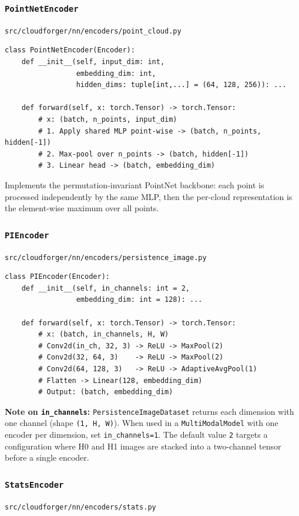 \documentclass[11pt, a4paper]{article}
\newcommand{\code}[1]{\texttt{#1}}
\newcommand{\pyfile}[1]{\texttt{\small #1}}
\newcommand{\typename}[1]{\textbf{\texttt{#1}}}
\begin{document}
\subsubsection{\typename{PointNetEncoder}}
\pyfile{src/cloudforger/nn/encoders/point\_cloud.py}

\begin{lstlisting}
class PointNetEncoder(Encoder):
    def __init__(self, input_dim: int,
                 embedding_dim: int,
                 hidden_dims: tuple[int,...] = (64, 128, 256)): ...

    def forward(self, x: torch.Tensor) -> torch.Tensor:
        # x: (batch, n_points, input_dim)
        # 1. Apply shared MLP point-wise -> (batch, n_points, hidden[-1])
        # 2. Max-pool over n_points -> (batch, hidden[-1])
        # 3. Linear head -> (batch, embedding_dim)
\end{lstlisting}

Implements the permutation-invariant PointNet backbone:
each point is processed independently by the same MLP, then the
per-cloud representation is the element-wise maximum over all points.

\subsubsection{\typename{PIEncoder}}
\pyfile{src/cloudforger/nn/encoders/persistence\_image.py}

\begin{lstlisting}
class PIEncoder(Encoder):
    def __init__(self, in_channels: int = 2,
                 embedding_dim: int = 128): ...

    def forward(self, x: torch.Tensor) -> torch.Tensor:
        # x: (batch, in_channels, H, W)
        # Conv2d(in_ch, 32, 3) -> ReLU -> MaxPool(2)
        # Conv2d(32, 64, 3)    -> ReLU -> MaxPool(2)
        # Conv2d(64, 128, 3)   -> ReLU -> AdaptiveAvgPool(1)
        # Flatten -> Linear(128, embedding_dim)
        # Output: (batch, embedding_dim)
\end{lstlisting}

\textbf{Note on \code{in\_channels}:}
\code{PersistenceImageDataset} returns each dimension with one channel
(shape \code{(1, H, W)}).
When used in a \code{MultiModalModel} with one encoder per dimension,
set \code{in\_channels=1}.
The default value \code{2} targets a configuration where H0 and H1
images are stacked into a two-channel tensor before a single encoder.

\subsubsection{\typename{StatsEncoder}}
\pyfile{src/cloudforger/nn/encoders/stats.py}
\end{document}
